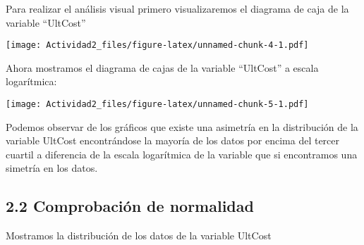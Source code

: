 \documentclass[
  a4paper]{article}
\newenvironment{Shaded}{\begin{snugshade}}{\end{snugshade}}
\newcommand{\AttributeTok}[1]{\textcolor[rgb]{0.77,0.63,0.00}{#1}}
\newcommand{\FunctionTok}[1]{\textcolor[rgb]{0.00,0.00,0.00}{#1}}
\newcommand{\NormalTok}[1]{#1}
\newcommand{\SpecialCharTok}[1]{\textcolor[rgb]{0.00,0.00,0.00}{#1}}
\newcommand{\StringTok}[1]{\textcolor[rgb]{0.31,0.60,0.02}{#1}}
\begin{document}
Para realizar el análisis visual primero visualizaremos el diagrama de
caja de la variable ``UltCost''

\begin{Shaded}
\end{Shaded}

\texttt{[image: Actividad2\_files/figure-latex/unnamed-chunk-4-1.pdf]}

Ahora mostramos el diagrama de cajas de la variable ``UltCost'' a escala
logarítmica:

\begin{Shaded}
\end{Shaded}

\texttt{[image: Actividad2\_files/figure-latex/unnamed-chunk-5-1.pdf]}

Podemos observar de los gráficos que existe una asimetría en la
distribución de la variable UltCost encontrándose la mayoría de los
datos por encima del tercer cuartil a diferencia de la escala
logarítmica de la variable que si encontramos una simetría en los datos.

\hypertarget{comprobaciuxf3n-de-normalidad}{%
\subsection{2.2 Comprobación de
normalidad}\label{comprobaciuxf3n-de-normalidad}}

Mostramos la distribución de los datos de la variable UltCost

\begin{Shaded}
\end{Shaded}
\end{document}
